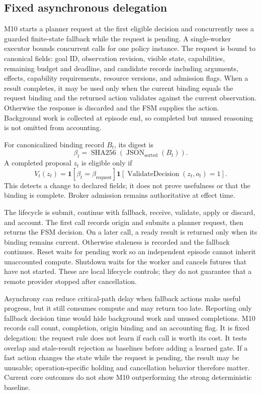 \subsection{Fixed asynchronous delegation}\label{sec:method-m10}
M10 starts a planner request at the first eligible decision and concurrently uses a guarded finite-state fallback while the request is pending. A single-worker executor bounds concurrent calls for one policy instance. The request is bound to canonical fields: goal ID, observation revision, visible state, capabilities, remaining budget and deadline, and candidate records including arguments, effects, capability requirements, resource versions, and admission flags. When a result completes, it may be used only when the current binding equals the request binding and the returned action validates against the current observation. Otherwise the response is discarded and the FSM supplies the action. Background work is collected at episode end, so completed but unused reasoning is not omitted from accounting.

For canonicalized binding record $B_t$, its digest is
\begin{equation}
\beta_t=\operatorname{SHA256}(\operatorname{JSON}_{\mathrm{sorted}}(B_t)).
\end{equation}
A completed proposal $z_t$ is eligible only if
\begin{equation}
V_t(z_t)=\mathbf{1}[\beta_t=\beta_{\mathrm{request}}]
\mathbf{1}[\operatorname{ValidateDecision}(z_t,o_t)=1].
\end{equation}
This detects a change to declared fields; it does not prove usefulness or that the binding is complete. Broker admission remains authoritative at effect time.

The lifecycle is submit, continue with fallback, receive, validate, apply or discard, and account. The first call records origin and submits a planner request, then returns the FSM decision. On a later call, a ready result is returned only when its binding remains current. Otherwise staleness is recorded and the fallback continues. Reset waits for pending work so an independent episode cannot inherit unaccounted compute. Shutdown waits for the worker and cancels futures that have not started. These are local lifecycle controls; they do not guarantee that a remote provider stopped after cancellation.

Asynchrony can reduce critical-path delay when fallback actions make useful progress, but it still consumes compute and may return too late. Reporting only fallback decision time would hide background work and unused completions. M10 records call count, completion, origin binding and an accounting flag. It is fixed delegation: the request rule does not learn if each call is worth its cost. It tests overlap and stale-result rejection as baselines before adding a learned gate. If a fast action changes the state while the request is pending, the result may be unusable; operation-specific holding and cancellation behavior therefore matter. Current core outcomes do not show M10 outperforming the strong deterministic baseline.



